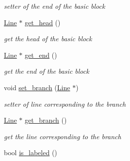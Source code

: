 \begin{DoxyCompactItemize}
\begin{DoxyCompactList}\small\item\em setter of the end of the basic block \end{DoxyCompactList}\item 
\hypertarget{class_basic__block_abe86f815d4a546391010e27511efa1e3}{\hyperlink{class_line}{Line} $\ast$ \hyperlink{class_basic__block_abe86f815d4a546391010e27511efa1e3}{get\+\_\+head} ()}\label{class_basic__block_abe86f815d4a546391010e27511efa1e3}

\begin{DoxyCompactList}\small\item\em get the head of the basic block \end{DoxyCompactList}\item 
\hypertarget{class_basic__block_a1540cc09dfd12636307e77b7d45b0b72}{\hyperlink{class_line}{Line} $\ast$ \hyperlink{class_basic__block_a1540cc09dfd12636307e77b7d45b0b72}{get\+\_\+end} ()}\label{class_basic__block_a1540cc09dfd12636307e77b7d45b0b72}

\begin{DoxyCompactList}\small\item\em get the end of the basic block \end{DoxyCompactList}\item 
\hypertarget{class_basic__block_a8e279325cafff22e2805cf0bd1b2b8d0}{void \hyperlink{class_basic__block_a8e279325cafff22e2805cf0bd1b2b8d0}{set\+\_\+branch} (\hyperlink{class_line}{Line} $\ast$)}\label{class_basic__block_a8e279325cafff22e2805cf0bd1b2b8d0}

\begin{DoxyCompactList}\small\item\em setter of line corresponding to the branch \end{DoxyCompactList}\item 
\hypertarget{class_basic__block_a0c0dbb20d9a86ab80878d168642b7cce}{\hyperlink{class_line}{Line} $\ast$ \hyperlink{class_basic__block_a0c0dbb20d9a86ab80878d168642b7cce}{get\+\_\+branch} ()}\label{class_basic__block_a0c0dbb20d9a86ab80878d168642b7cce}

\begin{DoxyCompactList}\small\item\em get the line corresponding to the branch \end{DoxyCompactList}\item 
\hypertarget{class_basic__block_a94840ac976b27d9024f4c04efb276ac1}{bool \hyperlink{class_basic__block_a94840ac976b27d9024f4c04efb276ac1}{is\+\_\+labeled} ()}\label{class_basic__block_a94840ac976b27d9024f4c04efb276ac1}


\end{DoxyCompactItemize}
